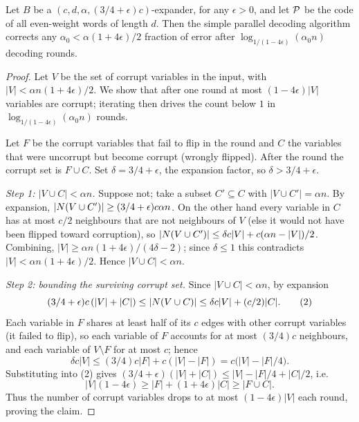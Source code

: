 \begin{theorem}
  \label{thm:parallel-correct}
  Let $B$ be a $(c,d,\alpha,(3/4+\epsilon)c)$-expander, for any $\epsilon>0$, and
  let $\mathcal{P}$ be the code of all even-weight words of length $d$. Then the simple
  parallel decoding algorithm corrects any
  $\alpha_0 < \alpha(1+4\epsilon)/2$ fraction of error after
  $\log_{1/(1-4\epsilon)}(\alpha_0 n)$ decoding rounds.
\end{theorem}
\begin{proof}
  Let $V$ be the set of corrupt variables in the input, with
  $|V| < \alpha n(1+4\epsilon)/2$. We show that after one round at most
  $(1-4\epsilon)|V|$ variables are corrupt; iterating then drives the count
  below $1$ in $\log_{1/(1-4\epsilon)}(\alpha_0 n)$ rounds.

  Let $F$ be the corrupt variables that fail to flip in the round and $C$ the
  variables that were uncorrupt but become corrupt (wrongly flipped). After the
  round the corrupt set is $F \cup C$. Set $\delta = 3/4+\epsilon$, the
  expansion factor, so $\delta > 3/4+\epsilon$.

  \emph{Step 1: $|V \cup C| < \alpha n$.} Suppose not; take a subset $C'
  \subseteq C$ with $|V\cup C'| = \alpha n$. By expansion,
  $|N(V\cup C')| \ge (3/4+\epsilon)c\alpha n$. On the other hand every
  variable in $C$ has at most $c/2$ neighbours that are not neighbours of $V$
  (else it would not have been flipped toward corruption), so
  $|N(V\cup C')| \le \delta c|V| + c(\alpha n - |V|)/2$. Combining,
  $|V| \ge \alpha n(1+4\epsilon)/(4\delta-2)$; since $\delta \le 1$ this
  contradicts $|V| < \alpha n(1+4\epsilon)/2$. Hence $|V\cup C| < \alpha n$.

  \emph{Step 2: bounding the surviving corrupt set.} Since
  $|V\cup C| < \alpha n$, by expansion
  \[
    (3/4+\epsilon)c\,(|V|+|C|) \le |N(V\cup C)| \le \delta c|V| + (c/2)|C|.
    \tag{2}
  \]
  Each variable in $F$ shares at least half of its $c$ edges with other corrupt
  variables (it failed to flip), so each variable of $F$ accounts for at most
  $(3/4)c$ neighbours, and each variable of $V\setminus F$ for at most $c$;
  hence
  \[
    \delta c|V| \le (3/4)c|F| + c(|V|-|F|) = c\bigl(|V|-|F|/4\bigr).
  \]
  Substituting into (2) gives
  $(3/4+\epsilon)(|V|+|C|) \le |V| - |F|/4 + |C|/2$, i.e.
  \[
    |V|(1-4\epsilon) \ge |F| + (1+4\epsilon)|C| \ge |F\cup C|.
  \]
  Thus the number of corrupt variables drops to at most $(1-4\epsilon)|V|$ each
  round, proving the claim.
\end{proof}

